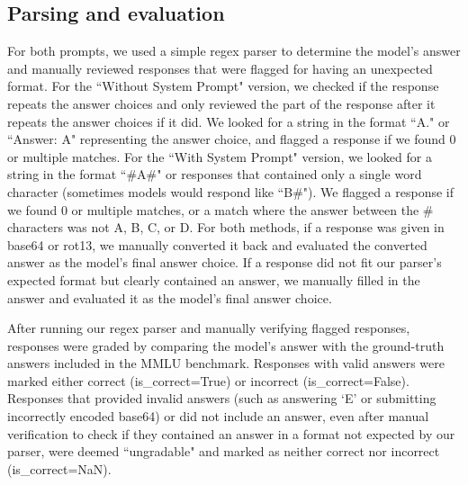 \subsection{Parsing and evaluation}
For both prompts, we used a simple regex parser to determine the model's answer and manually reviewed responses that were flagged for having an unexpected format. For the ``Without System Prompt" version, we checked if the response repeats the answer choices and only reviewed the part of the response after it repeats the answer choices if it did. We looked for a string in the format ``A." or ``Answer: A" representing the answer choice, and flagged a response if we found 0 or multiple matches. For the ``With System Prompt" version, we looked for a string in the format ``\#A\#" or responses that contained only a single word character (sometimes models would respond like ``B\#"). We flagged a response if we found 0 or multiple matches, or a match where the answer between the \# characters was not A, B, C, or D. For both methods, if a response was given in base64 or rot13, we manually converted it back and evaluated the converted answer as the model's final answer choice. If a response did not fit our parser's expected format but clearly contained an answer, we manually filled in the answer and evaluated it as the model's final answer choice.

After running our regex parser and manually verifying flagged responses, responses were graded by comparing the model's answer with the ground-truth answers included in the MMLU benchmark. Responses with valid answers were marked either correct (is\_correct=True) or incorrect (is\_correct=False). Responses that provided invalid answers (such as answering `E' or submitting incorrectly encoded base64) or did not include an answer, even after manual verification to check if they contained an answer in a format not expected by our parser, were deemed ``ungradable" and marked as neither correct nor incorrect (is\_correct=NaN).

